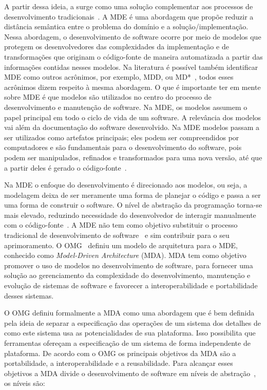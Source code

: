 A partir dessa ideia, a  surge como uma solução complementar aos processos de desenvolvimento tradicionais~\cite{Lima_2007}. A MDE é uma abordagem que propõe reduzir a distância semântica entre o problema do domínio e a solução/implementação. Nessa abordagem, o desenvolvimento de software ocorre por meio de modelos que protegem os desenvolvedores das complexidades da implementação e de transformações que originam o código-fonte de maneira automatizada a partir das informações contidas nesses modelos. Na literatura é possível também identificar MDE como outros acrônimos, por exemplo, MDD,  ou MD*~\cite{Kleppe:2003}, todos esses acrônimos dizem respeito à mesma abordagem. O que é importante ter em mente sobre MDE é que modelos são utilizados no centro do processo de desenvolvimento e manutenção de software. Na MDE, os modelos assumem o papel principal em todo o ciclo de vida de um software. A relevância dos modelos vai além da documentação do software desenvolvido. Na MDE modelos passam a ser utilizados como artefatos principais; eles podem ser compreendidos por computadores e são fundamentais para o desenvolvimento do software, pois podem ser manipulados, refinados e transformados para uma nova versão, até que a partir deles é gerado o código-fonte~\cite{Kleppe:2003, Brown_2007, Ben_Ammar}.

Na MDE o enfoque do desenvolvimento é direcionado aos modelos, ou seja, a modelagem deixa de ser meramente uma forma de planejar o código e passa a ser uma forma de construir o software. O nível de abstração da programação torna-se mais elevado, reduzindo necessidade do desenvolvedor de interagir manualmente com o código-fonte~\cite{Braganca_Machado}. A MDE não tem como objetivo substituir o processo tradicional de desenvolvimento de software~\cite{Kleppe:2003, Brown_2007, Braganca_Machado} e sim contribuir para o seu aprimoramento. O OMG~\cite{ADM:OMG} definiu um modelo de arquitetura para o MDE, conhecido como \emph{Model-Driven Architecture} (MDA). MDA tem como objetivo promover o uso de modelos no desenvolvimento de software, para fornecer uma solução ao gerenciamento da complexidade do desenvolvimento, manutenção e evolução de sistemas de software e favorecer a interoperabilidade e portabilidade desses sistemas.

O OMG definiu formalmente a MDA como uma abordagem que é bem definida pela ideia de separar a especificação das operações de um sistema dos detalhes de como este sistema usa as potencialidades de sua plataforma. Isso possibilita que ferramentas ofereçam a especificação de um sistema de forma independente de plataforma. De acordo com o OMG os principais objetivos da MDA são a portabilidade, a interoperabilidade e a reusabilidade. Para alcançar esses objetivos a MDA divide o desenvolvimento de software em níveis de abstração~\cite{France_2007, Ben_Ammar}, os níveis são:

